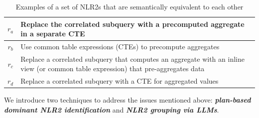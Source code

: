 \begin{table}[tbp]
\inv
    \renewcommand{\arraystretch}{1.25} %
    \centering
    \small
    \begin{tabular}{|c|p{9cm}|}
        \hline
        $r_a$ & Replace the correlated subquery with a precomputed aggregate in a separate CTE \\
        \hline
        $r_b$ & Use common table expressions (CTEs) to precompute aggregates \\
        \hline
        $r_c$ & Replace a correlated subquery that computes an aggregate with an inline view (or common table expression) that pre-aggregates data \\
        \hline
        $r_d$ & Replace a correlated subquery with a CTE for aggregated values \\
        \hline
    \end{tabular}
    \captionsetup{font=small,name=Table}
    \caption{Examples of a set of  NLR2s that are semantically equivalent to each other}
    \label{gen:tab:similar_rules}
    \inv
\end{table}





We introduce two techniques to address the issues mentioned above: \textbf{\textit{plan-based dominant NLR2 identification}} and \textbf{\textit{NLR2 grouping via LLMs}}.


